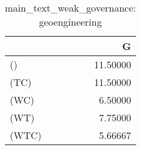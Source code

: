 \begin{table}
\centering
\caption{main_text_weak_governance: geoengineering}
\begin{tabular}{lr}
\toprule
{} &        G \\
\midrule
()    & 11.50000 \\
(TC)  & 11.50000 \\
(WC)  &  6.50000 \\
(WT)  &  7.75000 \\
(WTC) &  5.66667 \\
\bottomrule
\end{tabular}
\end{table}
